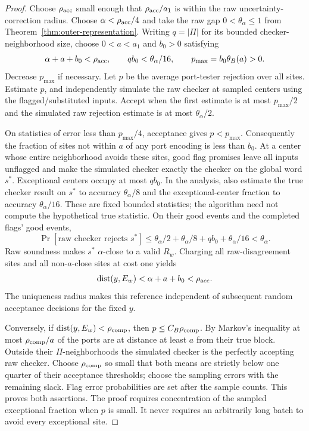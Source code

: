 \begin{proof}
Choose $\rho_{\rm acc}$ small enough that
$\rho_{\rm acc}/a_1$ is within the raw uncertainty-correction radius.
Choose $\alpha<\rho_{\rm acc}/4$ and take the raw gap
$0<\theta_\alpha\leq1$ from Theorem~\ref{thm:outer-representation}.
Writing $q=|\Pi|$ for its bounded checker-neighborhood size, choose
$0<a<a_1$ and $b_0>0$ satisfying
\begin{equation}\label{out:validation-constants}
 \alpha+a+b_0<\rho_{\rm acc},\qquad
 qb_0<\theta_\alpha/16,
 \qquad p_{\max}=b_0\theta_B(a)>0.
\end{equation}
Decrease $p_{\max}$ if necessary. Let $p$ be the average port-tester
rejection over all sites. Estimate $p$, and independently simulate the
raw checker at sampled centers using the flagged/substituted inputs.
Accept when the first estimate is at most $p_{\max}/2$ and the simulated
raw rejection estimate is at most $\theta_\alpha/2$.

On statistics of error less than $p_{\max}/4$, acceptance gives
$p<p_{\max}$. Consequently the fraction of sites not within $a$ of any
port encoding is less than $b_0$. At a center whose entire neighborhood
avoids these sites, good flag promises leave all inputs unflagged and
make the simulated checker exactly the checker on the global word
$s^*$. Exceptional centers occupy at most $qb_0$. In the analysis,
also estimate the true checker result on $s^*$ to accuracy
$\theta_\alpha/8$ and the exceptional-center fraction to accuracy
$\theta_\alpha/16$. These are fixed bounded statistics; the algorithm
need not compute the hypothetical true statistic. On their good events
and the completed flags' good events,
\[
 \Pr[\text{raw checker rejects }s^*]
 \leq\theta_\alpha/2+\theta_\alpha/8+qb_0+\theta_\alpha/16
 <\theta_\alpha.
\]
Raw soundness makes $s^*$ $\alpha$-close to a valid $R_w$. Charging all
raw-disagreement sites and all non-$a$-close sites at cost one yields
\[
 \operatorname{dist}(y,E_w)<\alpha+a+b_0<\rho_{\rm acc}.
\]
The uniqueness radius makes this reference independent of subsequent
random acceptance decisions for the fixed $y$.

Conversely, if $\operatorname{dist}(y,E_w)<\rho_{\rm comp}$, then
$p\leq C_B\rho_{\rm comp}$. By Markov's inequality at most
$\rho_{\rm comp}/a$ of the ports are at distance at least $a$ from their
true block. Outside their $\Pi$-neighborhoods the simulated checker is
the perfectly accepting raw checker. Choose $\rho_{\rm comp}$ so small
that both means are strictly below one quarter of their acceptance
thresholds; choose the sampling errors with the remaining slack. Flag
error probabilities are set after the sample counts. This proves both
assertions. The proof requires concentration of the sampled exceptional
fraction when $p$ is small. It never requires an arbitrarily long batch
to avoid every exceptional site.
\end{proof}

